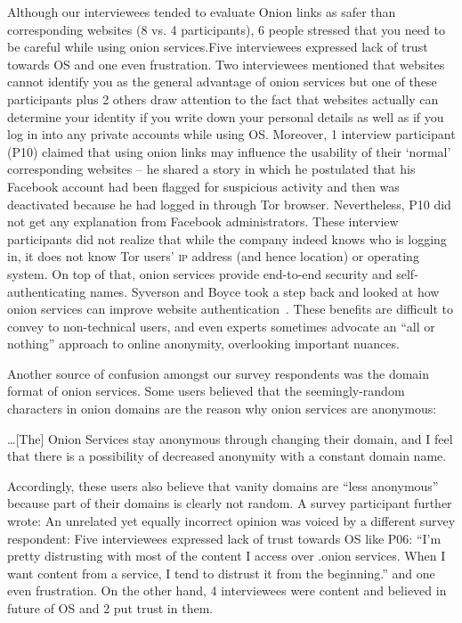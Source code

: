 Although our interviewees tended to evaluate Onion links as safer than corresponding websites (8 vs. 4 participants), 6 people stressed that you need to be careful while using onion services.Five interviewees expressed lack of trust towards OS  and one even frustration.  Two interviewees mentioned that websites cannot identify you as the general advantage of onion services but one of these participants plus 2 others draw attention to the fact that websites actually can determine your identity if you write down your personal details as well as if you log in into any private accounts while using OS. Moreover, 1 interview participant (P10) claimed that using onion links may influence the usability of their ‘normal’ corresponding websites – he shared a story in which he postulated that his Facebook account had been flagged for suspicious activity and then was deactivated because he had logged in through Tor browser.  Nevertheless, P10 did not get any explanation from Facebook administrators. These interview participants did not realize that while the company indeed
knows who is logging in, it does not know Tor users' \textsc{ip} address (and
hence location) or operating system. On top of that, onion services provide
end-to-end security and self-authenticating names.  Syverson and Boyce took a
step back and looked at how onion services can improve website
authentication~\cite{Syverson2015a}.  These benefits are difficult to convey to
non-technical users, and even experts sometimes advocate an ``all or nothing''
approach to online anonymity, overlooking important nuances. 

Another source of confusion amongst our survey respondents was the domain format of
onion services.  Some users believed that the seemingly-random
characters in onion domains are the reason why onion services are anonymous:

\begin{displayquote}
\ldots [The] Onion Services stay anonymous through changing their domain, and I
feel that there is a possibility of decreased anonymity with a constant domain
name.
\end{displayquote}

Accordingly, these users also believe that vanity domains  are ``less anonymous''
because part of their domains is clearly not random.  A survey participant
further wrote:   An unrelated yet
equally incorrect opinion was voiced by a different survey respondent:
 Five interviewees expressed lack of trust towards OS like P06: “I'm pretty distrusting with most of the content I access over .onion services. When I want content from a service, I tend to distrust it from the beginning.” and one even frustration. On the other hand, 4 interviewees were content and believed in future of OS and 2 put trust in them.

